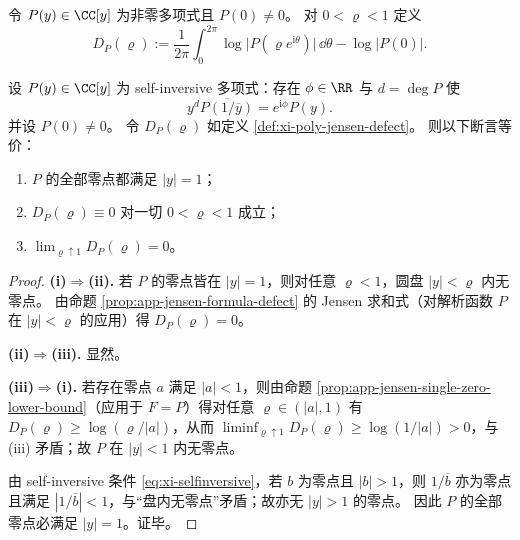 \begin{definition}\label{def:xi-poly-jensen-defect}
令 \(P(y)\in\CC[y]\) 为非零多项式且 \(P(0)\neq 0\)。
对 \(0<\varrho<1\) 定义
\[
D_{P}(\varrho)
:=\frac{1}{2\pi}\int_{0}^{2\pi}\log\bigl|P(\varrho e^{\mathrm{i}\theta})\bigr|\,\dd\theta-\log|P(0)|.
\]
\end{definition}

\begin{theorem}\label{thm:xi-selfinversive-jensen-criterion}
设 \(P(y)\in\CC[y]\) 为 self-inversive 多项式：存在 \(\phi\in\RR\) 与 \(d=\deg P\) 使
\begin{equation}\label{eq:xi-selfinversive}
y^{d}\overline{P(1/\overline{y})}=e^{\mathrm{i}\phi}P(y).
\end{equation}
并设 \(P(0)\neq 0\)。
令 \(D_P(\varrho)\) 如定义 \ref{def:xi-poly-jensen-defect}。
则以下断言等价：
\begin{enumerate}
  \item[(i)] \(P\) 的全部零点都满足 \(|y|=1\)；
  \item[(ii)] \(D_{P}(\varrho)\equiv 0\) 对一切 \(0<\varrho<1\) 成立；
  \item[(iii)] \(\displaystyle \lim_{\varrho\uparrow 1}D_{P}(\varrho)=0\)。
\end{enumerate}
\end{theorem}

\begin{proof}
\textbf{(i)\(\Rightarrow\)(ii).}
若 \(P\) 的零点皆在 \(|y|=1\)，则对任意 \(\varrho<1\)，圆盘 \(|y|<\varrho\) 内无零点。
由命题 \ref{prop:app-jensen-formula-defect} 的 Jensen 求和式（对解析函数 \(P\) 在 \(|y|<\varrho\) 的应用）得 \(D_P(\varrho)=0\)。
\par
\textbf{(ii)\(\Rightarrow\)(iii).} 显然。
\par
\textbf{(iii)\(\Rightarrow\)(i).}
若存在零点 \(a\) 满足 \(|a|<1\)，则由命题 \ref{prop:app-jensen-single-zero-lower-bound}（应用于 \(F=P\)）得对任意 \(\varrho\in(|a|,1)\) 有
\(
D_P(\varrho)\ge \log(\varrho/|a|)
\)，从而
\(
\liminf_{\varrho\uparrow 1}D_P(\varrho)\ge \log(1/|a|)>0
\)，与 (iii) 矛盾；故 \(P\) 在 \(|y|<1\) 内无零点。
\par
由 self-inversive 条件 \eqref{eq:xi-selfinversive}，若 \(b\) 为零点且 \(|b|>1\)，则 \(1/\overline{b}\) 亦为零点且满足 \(|1/\overline{b}|<1\)，与“盘内无零点”矛盾；故亦无 \(|y|>1\) 的零点。
因此 \(P\) 的全部零点必满足 \(|y|=1\)。证毕。
\end{proof}

